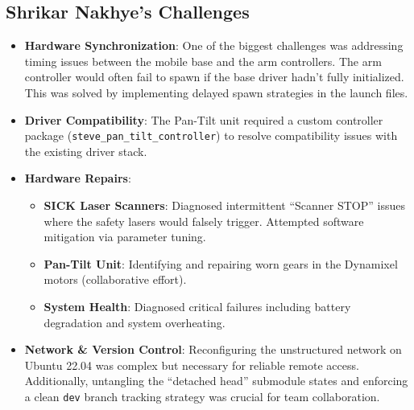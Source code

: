 \documentclass[12pt,oneside,a4paper]{article}
\begin{document}
\subsection{Shrikar Nakhye's Challenges}
\begin{itemize}
    \item \textbf{Hardware Synchronization}: One of the biggest challenges was addressing timing issues between the mobile base and the arm controllers. The arm controller would often fail to spawn if the base driver hadn't fully initialized. This was solved by implementing delayed spawn strategies in the launch files.
    \item \textbf{Driver Compatibility}: The Pan-Tilt unit required a custom controller package (\texttt{steve\_pan\_tilt\_controller}) to resolve compatibility issues with the existing driver stack.
    \item \textbf{Hardware Repairs}:
    \begin{itemize}
        \item \textbf{SICK Laser Scanners}: Diagnosed intermittent ``Scanner STOP'' issues where the safety lasers would falsely trigger. Attempted software mitigation via parameter tuning.
        \item \textbf{Pan-Tilt Unit}: Identifying and repairing worn gears in the Dynamixel motors (collaborative effort).
        \item \textbf{System Health}: Diagnosed critical failures including battery degradation and system overheating.
    \end{itemize}
    \item \textbf{Network & Version Control}: Reconfiguring the unstructured network on Ubuntu 22.04 was complex but necessary for reliable remote access. Additionally, untangling the ``detached head'' submodule states and enforcing a clean \texttt{dev} branch tracking strategy was crucial for team collaboration.
\end{itemize}
\end{document}
